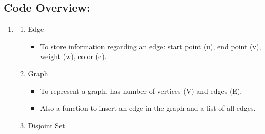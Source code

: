 \documentclass{report}
\begin{document}
\begin{titlepage}
    \newpage

    \section*{Code Overview:}
    \vspace{1.0em}

    \begin{enumerate}[label={\fontsize{14}{16}\selectfont \arabic*.}]

        \item {\fontsize{14}{16} \selectfont {}}

              \begin{enumerate}

                  \item {\fontsize{13}{14} \selectfont Edge}

                        \begin{itemize}

                            \fontsize{12}{14} \selectfont

                            \item To store information regarding an edge: start
                                  point
                                  (u), end point (v), weight (w), color (c).

                        \end{itemize}

                        \vspace{0.8em}

                  \item {\fontsize{13}{14} \selectfont Graph}
                        \begin{itemize}

                            \fontsize{12}{14} \selectfont

                            \item To represent a graph, has number of vertices
                                  (V) and edges (E).
                            \item Also a function to insert an edge in the
                                  graph and a list of all edges.

                        \end{itemize}

                        \vspace{0.8em}

                  \item {\fontsize{13}{14} \selectfont Disjoint Set}
                        \begin{itemize}


\end{itemize}
\end{enumerate}
\end{enumerate}
\end{titlepage}
\end{document}
